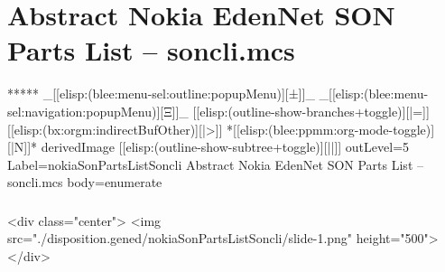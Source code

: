 \section{Abstract Nokia EdenNet SON Parts List -- soncli.mcs}

\begin{whenOrg}
*****  _[[elisp:(blee:menu-sel:outline:popupMenu)][±]]_ _[[elisp:(blee:menu-sel:navigation:popupMenu)][Ξ]]_ [[elisp:(outline-show-branches+toggle)][|=]] [[elisp:(bx:orgm:indirectBufOther)][|>]] *[[elisp:(blee:ppmm:org-mode-toggle)][|N]]*  derivedImage [[elisp:(outline-show-subtree+toggle)][||]] outLevel=5 Label=nokiaSonPartsListSoncli Abstract Nokia EdenNet SON Parts List -- soncli.mcs body=enumerate
\end{whenOrg}

\begin{htmlonly}

\begin{frame}[fragile,plain,label=nokiaSonPartsListSoncli]
    \frametitle{}
    \framesubtitle{}
    \begin{rawhtml}
<div class="center">
<img src="./disposition.gened/nokiaSonPartsListSoncli/slide-1.png" height="500">
</div>
    \end{rawhtml}
\end{frame}
\end{htmlonly}

